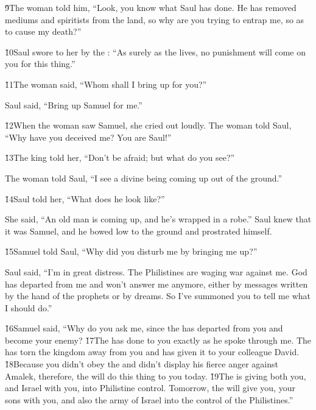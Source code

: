 \v{9}The woman told him, ``Look, you know what Saul has done. He has removed mediums and spiritists from the land, so why are you trying to entrap me, so as to cause my death?''

\v{10}Saul swore to her by the : ``As surely as the  lives, no punishment will come on you for this thing.''

\v{11}The woman said, ``Whom shall I bring up for you?''

Saul said, ``Bring up Samuel for me.''

\v{12}When the woman saw Samuel, she cried out loudly. The woman told Saul, ``Why have you deceived me? You are Saul!''

\v{13}The king told her, ``Don't be afraid; but what do you see?''

The woman told Saul, ``I see a divine being coming up out of the ground.''

\v{14}Saul told her, ``What does he look like?''

She said, ``An old man is coming up, and he's wrapped in a robe.'' Saul knew that it was Samuel, and he bowed low to the ground and prostrated himself.

\v{15}Samuel told Saul, ``Why did you disturb me by bringing me up?''

Saul said, ``I'm in great distress. The Philistines are waging war against me. God has departed from me and won't answer me anymore, either by messages written by the hand of the prophets or by dreams. So I've summoned you to tell me what I should do.''

\v{16}Samuel said, ``Why do you ask me, since the  has departed from you and become your enemy? \v{17}The  has done to you exactly as he spoke through me. The  has torn the kingdom away from you and has given it to your colleague David. \v{18}Because you didn't obey the  and didn't display his fierce anger against Amalek, therefore, the  will do this thing to you today. \v{19}The  is giving both you, and Israel with you, into Philistine control. Tomorrow, the  will give you, your sons with you, and also the army of Israel into the control of the Philistines.''

